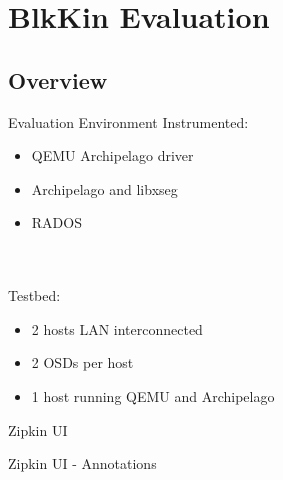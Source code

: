 \section{BlkKin Evaluation}
\subsection{Overview}
\begin{frame}{Evaluation Environment}
Instrumented:
\begin{itemize}
\item QEMU Archipelago driver
\item Archipelago and libxseg
\item RADOS
\end{itemize}
\hfill \\
\hfill \\
Testbed:
\begin{itemize}
\item 2 hosts LAN interconnected
\item 2 OSDs per host
\item 1 host running QEMU and Archipelago
\end{itemize}
\end{frame}

\begin{frame}{Zipkin UI}
\begin{center}
\end{center}
\end{frame}

\begin{frame}{Zipkin UI - Annotations}
\begin{center}
\end{center}
\end{frame}

